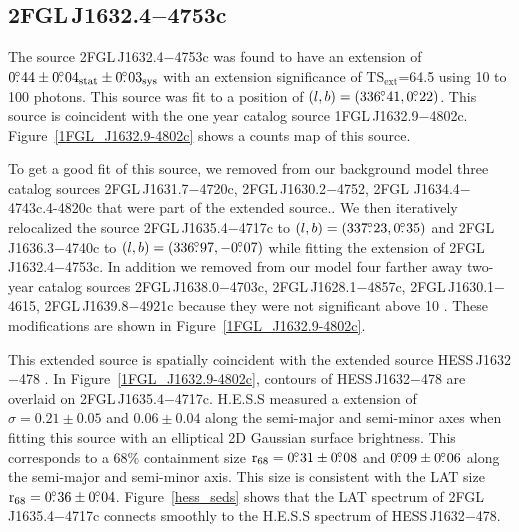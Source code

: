\documentclass[12pt,preprint]{aastex}
\newcommand{\gev}{\text{GeV}\xspace}
\newcommand{\tev}{\text{TeV}\xspace}
\newcommand{\tsext}{{\ensuremath{\text{TS}_{\text{ext}}}}\xspace}
\newcommand{\rsixeight}{{\ensuremath{\text{r}_{68}}}\xspace}
\newcommand{\sys}{\text{sys}\xspace}
\newcommand{\stat}{\text{stat}\xspace}
\begin{document}
\subsection{2FGL\,J1632.4$-$4753c}
\label{section_2FGL_J1632.4-4753c}



The source 2FGL\,J1632.4$-$4753c was found 
to
have an extension of $0\fdg44\pm0\fdg04_\stat\pm0\fdg03_\sys$ 
with an extension
significance of \tsext=64.5
using 10 \gev to 100 \gev photons.  This source was fit to a position of
$(l,b)=(336\mbox{$.\!\!^\circ$}41,0\mbox{$.\!\!^\circ$}22)$.  This source is coincident with the one
year catalog source 1FGL\,J1632.9$-$4802c.  Figure~\ref{1FGL_J1632.9-4802c}
shows a counts map of this source.

To get a good fit of this source, we removed from our background model
three catalog sources 2FGL\,J1631.7$-$4720c, 2FGL\,J1630.2$-$4752,
2FGL J1634.4$-$4743c.4-4820c that were part of the extended source..
We then iteratively relocalized the source 2FGL\,J1635.4$-$4717c
to $(l,b)=(337\mbox{$.\!\!^\circ$}23,0\mbox{$.\!\!^\circ$}35)$ and 2FGL\,J1636.3$-$4740c to
$(l,b)=(336\mbox{$.\!\!^\circ$}97,-0\mbox{$.\!\!^\circ$}07)$ while fitting the extension of
2FGL\,J1632.4$-$4753c.  In addition we removed from our model four
farther away two-year catalog sources 2FGL\,J1638.0$-$4703c, 
2FGL\,J1628.1$-$4857c, 2FGL\,J1630.1$-$4615, 2FGL\,J1639.8$-$4921c because they
were not significant above 10 \gev.  These modifications are shown
in Figure~\ref{1FGL_J1632.9-4802c}.  

This extended source is spatially coincident with the extended
\tev source HESS\,J1632$-$478 \citep{hess_plane_survey}.
In Figure~\ref{1FGL_J1632.9-4802c}, contours of  HESS\,J1632$-$478
are overlaid on 2FGL\,J1635.4$-$4717c.  H.E.S.S measured a 
extension of $\sigma=0.21\pm0.05$ and $0.06\pm0.04$ along the
semi-major and semi-minor axes when fitting this source with an
elliptical 2D Gaussian surface brightness.  This corresponds to a 68\%
containment size $\rsixeight=0\fdg31\pm0\fdg08$ and $0\mbox{$.\!\!^\circ$}09\pm0\mbox{$.\!\!^\circ$}06$
along the semi-major and semi-minor axis. This size is consistent with
the LAT size $\rsixeight=0\fdg36\pm0\fdg04$.  Figure~\ref{hess_seds}
shows that the LAT spectrum of 2FGL\,J1635.4$-$4717c connects smoothly to
the H.E.S.S spectrum of HESS\,J1632$-$478.
\end{document}
